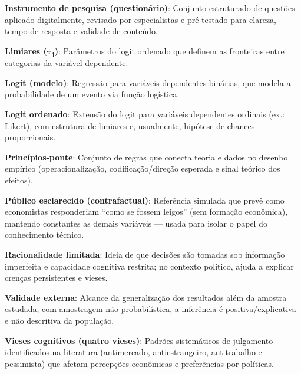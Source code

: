 {\textbf{Instrumento de pesquisa (questionário)}: Conjunto estruturado de questões aplicado digitalmente, revisado por especialistas e pré-testado para clareza, tempo de resposta e validade de conteúdo.

\textbf{Limiares ($\boldsymbol{\tau_j}$)}: Parâmetros do logit ordenado que definem as fronteiras entre categorias da variável dependente.

\textbf{Logit (modelo)}: Regressão para variáveis dependentes binárias, que modela a probabilidade de um evento via função logística.

\textbf{Logit ordenado}: Extensão do logit para variáveis dependentes ordinais (ex.: Likert), com estrutura de limiares e, usualmente, hipótese de chances proporcionais.

\textbf{Princípios-ponte}: Conjunto de regras que conecta teoria e dados no desenho empírico (operacionalização, codificação/direção esperada e sinal teórico dos efeitos).

\textbf{Público esclarecido (contrafactual)}: Referência simulada que prevê como economistas responderiam “como se fossem leigos” (sem formação econômica), mantendo constantes as demais variáveis — usada para isolar o papel do conhecimento técnico.

\textbf{Racionalidade limitada}: Ideia de que decisões são tomadas sob informação imperfeita e capacidade cognitiva restrita; no contexto político, ajuda a explicar crenças persistentes e vieses.

\textbf{Validade externa}: Alcance da generalização dos resultados além da amostra estudada; com amostragem não probabilística, a inferência é positiva/explicativa e não descritiva da população.

\textbf{Vieses cognitivos (quatro vieses)}: Padrões sistemáticos de julgamento identificados na literatura (antimercado, antiestrangeiro, antitrabalho e pessimista) que afetam percepções econômicas e preferências por políticas.

} %



